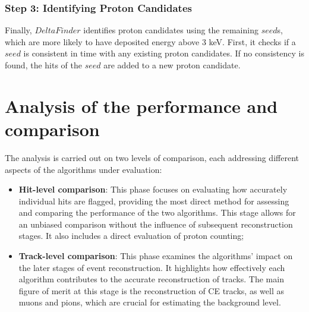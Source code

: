 \subsubsection{Step 3: Identifying Proton Candidates}
Finally, $DeltaFinder$ identifies proton candidates 
using the remaining $seed$s, which are more likely 
to have deposited energy above 3 keV. First, it checks 
if a $seed$ is consistent in time with any existing 
proton candidates. If no consistency is found, 
the hits of the $seed$ are added to a new proton candidate.


\section{Analysis of the performance and comparison}
The analysis is carried out on two levels of 
comparison, each addressing different aspects of the algorithms under evaluation:

\begin{itemize}
    \item \textbf{Hit-level comparison}: This phase focuses 
    on evaluating how accurately individual hits are 
    flagged, providing the most direct method for 
    assessing and comparing the performance of the two 
    algorithms. This stage allows for an unbiased 
    comparison without the influence of subsequent 
    reconstruction stages. It also includes a direct evaluation of proton counting;
    
    \item \textbf{Track-level comparison}: This phase examines 
    the algorithms' impact on the later stages of 
    event reconstruction. It highlights how effectively 
    each algorithm contributes to the accurate reconstruction 
    of tracks. The main figure of merit at this stage is the 
    reconstruction of CE tracks, as well as muons and pions, which are crucial 
    for estimating the background level.
\end{itemize}

